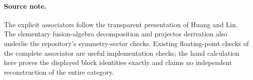 \paragraph{Source note.}
The explicit associators follow the transparent presentation of
Huang and Lin.  The elementary fusion-algebra decomposition and
projector derivation also underlie the repository's symmetry-sector
checks.  Existing floating-point checks of the complete associator
are useful implementation checks; the hand calculation here proves
the displayed block identities exactly and claims no independent
reconstruction of the entire category.

